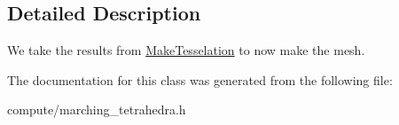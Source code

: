 \subsection{Detailed Description}
We take the results from \hyperlink{classmgs_1_1march_1_1MakeTesselation}{Make\+Tesselation} to now make the mesh. 

The documentation for this class was generated from the following file\+:\begin{DoxyCompactItemize}
\item 
compute/marching\+\_\+tetrahedra.\+h\end{DoxyCompactItemize}
